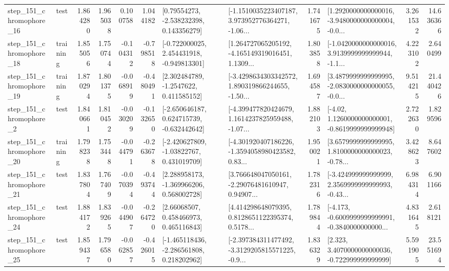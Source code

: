 \begin{tabular}{llrrrrllrlrr}
  step\_151\_chromophore\_16 &      test &      1.864280 &    1.965038 &      0.100758 &  1.044182 &     [0.79554273, -2.538232398, 0.143356279] &  [-1.1510035223407187, 3.973952776364271, -1.06... &       1.741675 &  [1.2920000000000016, -3.9480000000000004, -0.0... &            3.261532 &         14.636366 \\
  step\_151\_chromophore\_18 &  training &      1.855056 &    1.750744 &     -0.104312 & -0.798518 &   [-0.722000025, 2.454431918, -0.949813301] &  [1.264727065205192, -4.165149319016451, 1.1309... &       1.803858 &  [-1.0420000000000016, 3.9139999999999944, -1.1... &            4.223102 &          2.640499 \\
  step\_151\_chromophore\_19 &  training &      1.870294 &    1.801375 &     -0.068919 & -0.480491 &      [2.302484789, -1.2547622, 0.411585152] &  [-3.4298634303342572, 1.890319866244655, -1.50... &       1.694587 &  [3.4879999999999995, -2.0830000000000055, -0.0... &            9.514215 &         21.440426 \\
   step\_151\_chromophore\_2 &      test &      1.840661 &    1.810452 &     -0.030209 & -0.132650 &   [-2.650646187, 0.624715739, -0.632442642] &  [-4.399477820424679, 1.1614237825959488, -1.07... &       1.882103 &   [-4.02, 1.1260000000000001, -0.8619999999999948] &            2.722630 &          1.829596 \\
  step\_151\_chromophore\_20 &  training &      1.798238 &    1.753448 &     -0.044791 & -0.263678 &    [-2.420627809, -1.03822767, 0.431019709] &  [-4.301920407186226, -1.3594058980423582, 0.83... &       1.950021 &  [3.6579999999999995, 1.8100000000000023, -0.78... &            3.428623 &          8.647602 \\
  step\_151\_chromophore\_21 &      test &      1.837804 &    1.767409 &     -0.070394 & -0.493744 &    [2.288958173, -1.369966206, 0.568002728] &  [3.766648047050161, -2.29076481610947, 0.94907... &       1.782316 &  [-3.424999999999999, 2.3569999999999993, -0.43... &            6.984314 &          6.901166 \\
  step\_151\_chromophore\_24 &      test &      1.884172 &    1.839265 &     -0.044907 & -0.264720 &      [2.66068507, 0.458466973, 0.465116843] &  [4.414298648079395, 0.8128651122395374, 0.5178... &       1.789844 &  [-4.173, -0.6009999999999991, -0.3840000000000... &            4.831645 &          2.618121 \\
  step\_151\_chromophore\_25 &      test &      1.859437 &    1.796580 &     -0.062857 & -0.426015 &   [-1.465118436, -2.286561808, 0.218202962] &  [-2.397384311477492, -3.3129205815571225, -0.9... &       1.836329 &    [2.323, 3.4070000000000036, -0.722999999999999] &            5.591905 &         23.551694 \\

\end{tabular}
